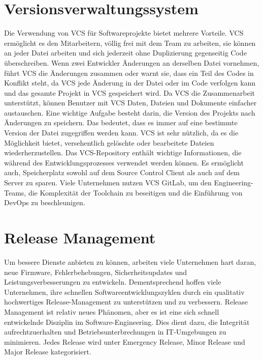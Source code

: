 \section{Versionsverwaltungssystem}

Die Verwendung von \ac{VCS} für Softwareprojekte bietet mehrere Vorteile. \acs{VCS} ermöglicht es den Mitarbeitern, völlig frei mit dem Team zu arbeiten, sie können an jeder Datei arbeiten und sich jederzeit ohne Duplizierung gegenseitig Code überschreiben. Wenn zwei Entwickler Änderungen an derselben Datei vornehmen, führt \acs{VCS} die Änderungen zusammen oder warnt sie, dass ein Teil des Codes in Konflikt steht, da \acs{VCS} jede Änderung in der Datei oder im Code verfolgen kann und das gesamte Projekt in \acs{VCS} gespeichert wird. Da \acs{VCS} die Zusammenarbeit unterstützt, können Benutzer mit \acs{VCS} Daten, Dateien und Dokumente einfacher austauschen.
Eine wichtige Aufgabe besteht darin, die Version des Projekts nach Änderungen zu speichern. Das bedeutet, dass es immer auf eine bestimmte Version der Datei zugegriffen werden kann. \acs{VCS} ist sehr nützlich, da es die Möglichkeit bietet, versehentlich gelöschte oder bearbeitete Dateien wiederherzustellen\cite{Greene}.
Das \acs{VCS}-Repository enthält wichtige Informationen, die während des Entwicklungsprozesses verwendet werden können. Es ermöglicht auch, Speicherplatz sowohl auf dem Source Control
Client als auch auf dem Server zu sparen. Viele Unternehmen nutzen \acs{VCS} GitLab, um den Engineering-Teams, die Komplexität der Toolchain zu beseitigen und die Einführung von DevOps zu beschleunigen.

\section{Release Management}

Um bessere Dienste anbieten zu können, arbeiten viele Unternehmen hart daran,
neue Firmware, Fehlerbehebungen, Sicherheitsupdates und Leistungsverbesserungen
zu entwickeln. Dementsprechend hoffen viele Unternehmen, ihre schnellen Softwareentwicklungszyklen durch ein qualitativ hochwertiges Release-Management
zu unterstützen und zu verbessern. Release Management ist relativ neues Phänomen,
aber es ist eine sich schnell entwickelnde Disziplin im Software-Engineering. Dies dient dazu, die Integrität aufrechtzuerhalten und Betriebsunterbrechungen in IT-Umgebungen zu minimieren. Jedes Release wird unter Emergency Release, Minor Release und Major Release kategorisiert.

